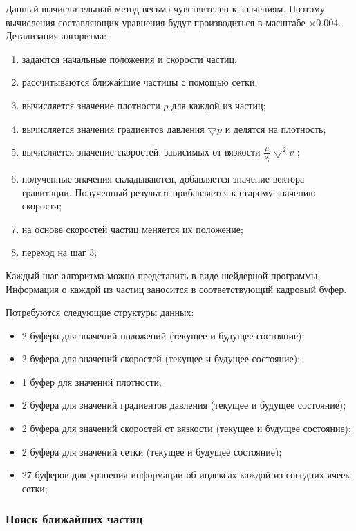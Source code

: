 Данный вычислительный метод весьма чувствителен к значениям. Поэтому вычисления составляющих
уравнения будут производиться в масштабе $\times0.004$. \\

Детализация алгоритма:

\begin{enumerate}
  \item задаются начальные положения и скорости частиц;
  \item рассчитываются ближайшие частицы с помощью сетки;
  \item вычисляется значение плотности $\rho$ для каждой из частиц;
  \item вычисляется значения градиентов давления $\bigtriangledown{}p$ и делятся на плотность;
  \item вычисляется значение скоростей, зависимых от вязкости $\frac{\mu}{\rho_i}\bigtriangledown^2v$ ;
  \item полученные значения складываются, добавляется значение вектора гравитации. Полученный
    результат прибавляется к старому значению скорости;
  \item на основе скоростей частиц меняется их положение;
  \item переход на шаг 3;
\end{enumerate}

Каждый шаг алгоритма можно представить в виде шейдерной программы. Информация о каждой из частиц 
заносится в соответствующий кадровый буфер. 

Потребуются следующие структуры данных:

\begin{itemize}
  \item 2 буфера для значений положений (текущее и будущее состояние);
  \item 2 буфера для значений скоростей (текущее и будущее состояние);
  \item 1 буфер для значений плотности;
  \item 2 буфера для значений градиентов давления (текущее и будущее состояние);
  \item 2 буфера для значений скоростей от вязкости (текущее и будущее состояние);
  \item 2 буфера для значений сетки (текущее и будущее состояние);
  \item 27 буферов для хранения информации об индексах каждой из соседних ячеек сетки;
\end{itemize}

\subsubsection{Поиск ближайших частиц}

